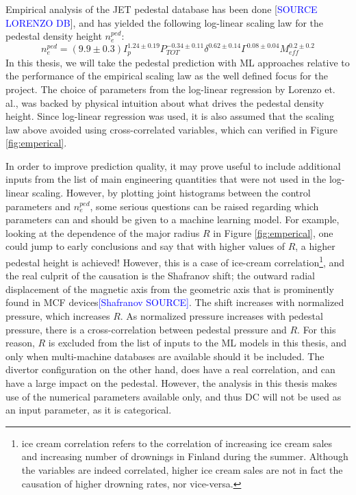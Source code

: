 \documentclass[a4paper, twoside, final, 12pt]{article}
\begin{document}
Empirical analysis of the JET pedestal database has been done [\textcolor{blue}{SOURCE LORENZO DB}], and has yielded the following log-linear scaling law for the pedestal density height $n_e^{ped}$:
\begin{equation} \label{eq:scaling}
	n_e^{ped} = (9.9 \pm 0.3) I_p^{1.24 \pm 0.19} P_{TOT}^{-0.34 \pm 0.11} \delta^{0.62 \pm 0.14} \Gamma^{ 0.08 \pm 0.04} M_{eff}^{0.2 \pm 0.2}
\end{equation}
In this thesis, we will take the pedestal prediction with ML approaches relative to the performance of the empirical scaling law as the well defined focus for the project.
The choice of parameters from the log-linear regression by Lorenzo et. al., was backed by physical intuition about what drives the pedestal density height. Since log-linear regression was used, it is also assumed that the scaling law above avoided using cross-correlated variables, which can verified in Figure \ref{fig:emperical}. 

In order to improve prediction quality, it may prove useful to include additional inputs from the list of main engineering quantities that were not used in the log-linear scaling.
However, by plotting joint histograms between the control parameters and $n_e^{ped}$, some serious questions can be raised regarding which parameters can and should be given to a machine learning model.
For example, looking at the dependence of the major radius $R$ in Figure  \ref{fig:emperical}, one could jump to early conclusions and say that with higher values of $R$, a higher pedestal height is achieved!
However, this is a case of ice-cream correlation\footnote{ice cream correlation refers to the correlation of increasing ice cream sales and increasing number of drownings in Finland during the summer. Although the variables are indeed correlated, higher ice cream sales are not in fact the causation of higher drowning rates, nor vice-versa.}, and the real culprit of the causation is the Shafranov shift; the outward radial displacement of the magnetic axis from the geometric axis that is prominently found in MCF devices\textcolor{blue}{[Shafranov SOURCE]}. The shift increases with normalized pressure, which increases $R$. As normalized pressure increases with pedestal pressure, there is a cross-correlation between pedestal pressure and $R$. For this reason, $R$ is excluded from the list of inputs to the ML models in this thesis, and only when multi-machine databases are available should it be included.
The divertor configuration on the other hand, does have a real correlation, and can have a large impact on the pedestal. However, the analysis in this thesis makes use of the numerical parameters available only, and thus DC will not be used as an input parameter, as it is categorical.  
\end{document}
